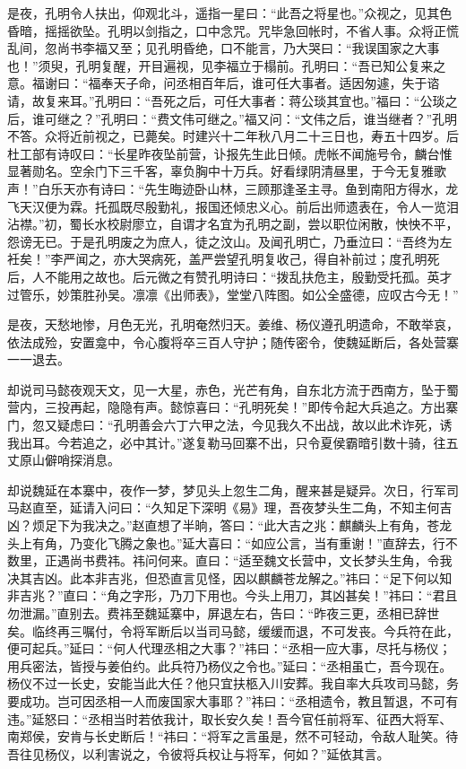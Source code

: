 是夜，孔明令人扶出，仰观北斗，遥指一星曰：“此吾之将星也。”众视之，见其色昏暗，摇摇欲坠。孔明以剑指之，口中念咒。咒毕急回帐时，不省人事。众将正慌乱间，忽尚书李福又至；见孔明昏绝，口不能言，乃大哭曰：“我误国家之大事也！”须臾，孔明复醒，开目遍视，见李福立于榻前。孔明曰：“吾已知公复来之意。福谢曰：“福奉天子命，问丞相百年后，谁可任大事者。适因匆遽，失于谘请，故复来耳。”孔明曰：“吾死之后，可任大事者：蒋公琰其宜也。”福曰：“公琰之后，谁可继之？”孔明曰：“费文伟可继之。”福又问：“文伟之后，谁当继者？”孔明不答。众将近前视之，已薨矣。时建兴十二年秋八月二十三日也，寿五十四岁。后杜工部有诗叹曰：“长星昨夜坠前营，讣报先生此日倾。虎帐不闻施号令，麟台惟显著勋名。空余门下三千客，辜负胸中十万兵。好看绿阴清昼里，于今无复雅歌声！”白乐天亦有诗曰：“先生晦迹卧山林，三顾那逢圣主寻。鱼到南阳方得水，龙飞天汉便为霖。托孤既尽殷勤礼，报国还倾忠义心。前后出师遗表在，令人一览泪沾襟。”初，蜀长水校尉廖立，自谓才名宜为孔明之副，尝以职位闲散，怏怏不平，怨谤无已。于是孔明废之为庶人，徒之汶山。及闻孔明亡，乃垂泣曰：“吾终为左衽矣！”李严闻之，亦大哭病死，盖严尝望孔明复收己，得自补前过；度孔明死后，人不能用之故也。后元微之有赞孔明诗曰：“拨乱扶危主，殷勤受托孤。英才过管乐，妙策胜孙吴。凛凛《出师表》，堂堂八阵图。如公全盛德，应叹古今无！”

是夜，天愁地惨，月色无光，孔明奄然归天。姜维、杨仪遵孔明遗命，不敢举哀，依法成殓，安置龛中，令心腹将卒三百人守护；随传密令，使魏延断后，各处营寨一一退去。

却说司马懿夜观天文，见一大星，赤色，光芒有角，自东北方流于西南方，坠于蜀营内，三投再起，隐隐有声。懿惊喜曰：“孔明死矣！”即传令起大兵追之。方出寨门，忽又疑虑曰：“孔明善会六丁六甲之法，今见我久不出战，故以此术诈死，诱我出耳。今若追之，必中其计。”遂复勒马回寨不出，只令夏侯霸暗引数十骑，往五丈原山僻哨探消息。

却说魏延在本寨中，夜作一梦，梦见头上忽生二角，醒来甚是疑异。次日，行军司马赵直至，延请入问曰：“久知足下深明《易》理，吾夜梦头生二角，不知主何吉凶？烦足下为我决之。”赵直想了半晌，答曰：“此大吉之兆：麒麟头上有角，苍龙头上有角，乃变化飞腾之象也。”延大喜曰：“如应公言，当有重谢！”直辞去，行不数里，正遇尚书费祎。祎问何来。直曰：“适至魏文长营中，文长梦头生角，令我决其吉凶。此本非吉兆，但恐直言见怪，因以麒麟苍龙解之。”祎曰：“足下何以知非吉兆？”直曰：“角之字形，乃刀下用也。今头上用刀，其凶甚矣！”祎曰：“君且勿泄漏。”直别去。费祎至魏延寨中，屏退左右，告曰：“昨夜三更，丞相已辞世矣。临终再三嘱付，令将军断后以当司马懿，缓缓而退，不可发丧。今兵符在此，便可起兵。”延曰：“何人代理丞相之大事？”祎曰：“丞相一应大事，尽托与杨仪；用兵密法，皆授与姜伯约。此兵符乃杨仪之令也。”延曰：“丞相虽亡，吾今现在。杨仪不过一长史，安能当此大任？他只宜扶柩入川安葬。我自率大兵攻司马懿，务要成功。岂可因丞相一人而废国家大事耶？”祎曰：“丞相遗令，教且暂退，不可有违。”延怒曰：“丞相当时若依我计，取长安久矣！吾今官任前将军、征西大将军、南郑侯，安肯与长史断后！“祎曰：“将军之言虽是，然不可轻动，令敌人耻笑。待吾往见杨仪，以利害说之，令彼将兵权让与将军，何如？”延依其言。

